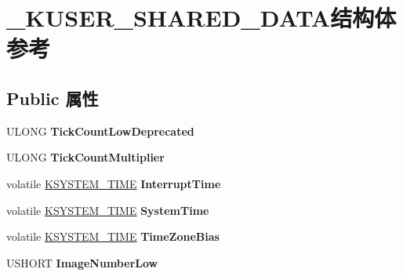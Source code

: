 \hypertarget{struct___k_u_s_e_r___s_h_a_r_e_d___d_a_t_a}{}\section{\+\_\+\+K\+U\+S\+E\+R\+\_\+\+S\+H\+A\+R\+E\+D\+\_\+\+D\+A\+T\+A结构体 参考}
\label{struct___k_u_s_e_r___s_h_a_r_e_d___d_a_t_a}
\subsection*{Public 属性}
\begin{DoxyCompactItemize}
\item 
\mbox{\label{struct___k_u_s_e_r___s_h_a_r_e_d___d_a_t_a_a264320d777ab3c0d0fab5eaa796d26b6}} 
U\+L\+O\+NG {\bfseries Tick\+Count\+Low\+Deprecated}
\item 
\mbox{\label{struct___k_u_s_e_r___s_h_a_r_e_d___d_a_t_a_a69d6b19fce54de8037e382d9f2a15df4}} 
U\+L\+O\+NG {\bfseries Tick\+Count\+Multiplier}
\item 
\mbox{\label{struct___k_u_s_e_r___s_h_a_r_e_d___d_a_t_a_a9340e424b36774176aa8e7992fd426e9}} 
volatile \hyperlink{struct___k_s_y_s_t_e_m___t_i_m_e}{K\+S\+Y\+S\+T\+E\+M\+\_\+\+T\+I\+ME} {\bfseries Interrupt\+Time}
\item 
\mbox{\label{struct___k_u_s_e_r___s_h_a_r_e_d___d_a_t_a_a1eee5b8fc94efa0ba090406484406128}} 
volatile \hyperlink{struct___k_s_y_s_t_e_m___t_i_m_e}{K\+S\+Y\+S\+T\+E\+M\+\_\+\+T\+I\+ME} {\bfseries System\+Time}
\item 
\mbox{\label{struct___k_u_s_e_r___s_h_a_r_e_d___d_a_t_a_ae10515b5c07dbefb2d16dbd186b00bf7}} 
volatile \hyperlink{struct___k_s_y_s_t_e_m___t_i_m_e}{K\+S\+Y\+S\+T\+E\+M\+\_\+\+T\+I\+ME} {\bfseries Time\+Zone\+Bias}
\item 
\mbox{\label{struct___k_u_s_e_r___s_h_a_r_e_d___d_a_t_a_afe880851549c64dc9f17c8a896fdbf65}} 
U\+S\+H\+O\+RT {\bfseries Image\+Number\+Low}

\end{DoxyCompactItemize}
